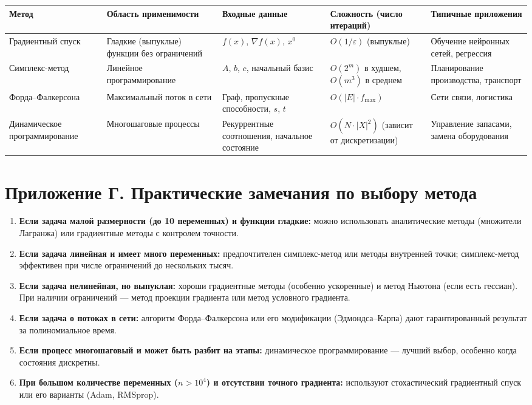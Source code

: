 \documentclass{article}
\theoremstyle{plain}
\begin{document}
\begin{center}
\renewcommand{\arraystretch}{1.3}
\begin{tabular}{|p{2.8cm}|p{2.2cm}|p{2.5cm}|p{2.5cm}|p{2.5cm}|}
\hline
\textbf{Метод} & \textbf{Область применимости} & \textbf{Входные данные} & \textbf{Сложность (число итераций)} & \textbf{Типичные приложения} \\
\hline
Градиентный спуск & Гладкие (выпуклые) функции без ограничений & $f(x)$, $\nabla f(x)$, $x^0$ & $O(1/\varepsilon)$ (выпуклые) & Обучение нейронных сетей, регрессия \\
\hline
Симплекс-метод & Линейное программирование & $A$, $b$, $c$, начальный базис & $O(2^m)$ в худшем, $O(m^3)$ в среднем & Планирование производства, транспорт \\
\hline
Форда–Фалкерсона & Максимальный поток в сети & Граф, пропускные способности, $s$, $t$ & $O(|E|\cdot f_{\max})$ & Сети связи, логистика \\
\hline
Динамическое программирование & Многошаговые процессы & Рекуррентные соотношения, начальное состояние & $O(N\cdot |X|^2)$ (зависит от дискретизации) & Управление запасами, замена оборудования \\
\hline
\end{tabular}
\end{center}

\section*{Приложение Г. Практические замечания по выбору метода}

\begin{enumerate}
  \item \textbf{Если задача малой размерности (до 10 переменных) и функции гладкие:} можно использовать аналитические методы (множители Лагранжа) или градиентные методы с контролем точности.
  \item \textbf{Если задача линейная и имеет много переменных:} предпочтителен симплекс-метод или методы внутренней точки; симплекс-метод эффективен при числе ограничений до нескольких тысяч.
  \item \textbf{Если задача нелинейная, но выпуклая:} хороши градиентные методы (особенно ускоренные) и метод Ньютона (если есть гессиан). При наличии ограничений — метод проекции градиента или метод условного градиента.
  \item \textbf{Если задача о потоках в сети:} алгоритм Форда–Фалкерсона или его модификации (Эдмондса–Карпа) дают гарантированный результат за полиномиальное время.
  \item \textbf{Если процесс многошаговый и может быть разбит на этапы:} динамическое программирование — лучший выбор, особенно когда состояния дискретны.
  \item \textbf{При большом количестве переменных ($n > 10^4$) и отсутствии точного градиента:} используют стохастический градиентный спуск или его варианты (Adam, RMSprop).
\end{enumerate}
\end{document}
